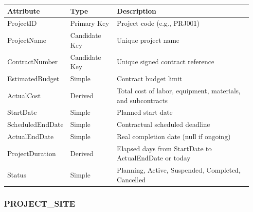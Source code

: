 \documentclass[a4paper,12pt]{report}
\newcounter{none} %
\begin{document}
{\def\LTcaptype{none} %
\begin{longtable}[]{@{}
  >{\raggedright\arraybackslash}p{}
  >{\raggedright\arraybackslash}p{}
  >{\raggedright\arraybackslash}p{}@{}}
\toprule\noalign{}
\begin{minipage}[b]{\linewidth}\raggedright
Attribute
\end{minipage} & \begin{minipage}[b]{\linewidth}\raggedright
Type
\end{minipage} & \begin{minipage}[b]{\linewidth}\raggedright
Description
\end{minipage} \\
\midrule\noalign{}
\endhead
\bottomrule\noalign{}
\endlastfoot
ProjectID & Primary Key & Project code (\allowbreak{}e.\allowbreak{}g., PRJ001) \\
ProjectName & Candidate Key & Unique project name \\
ContractNumber & Candidate Key & Unique signed contract reference \\
EstimatedBudget & Simple & Contract budget limit \\
ActualCost & Derived & Total cost of labor, equipment, materials, and subcontracts \\
StartDate & Simple & Planned start date \\
ScheduledEndDate & Simple & Contractual scheduled deadline \\
ActualEndDate & Simple & Real completion date (\allowbreak{}null if ongoing) \\
ProjectDuration & Derived & Elapsed days from StartDate to ActualEndDate or today \\
Status & Simple & Planning, Active, Suspended, Completed, Cancelled \\
\end{longtable}
}

\subsubsection{\texorpdfstring{PROJECT\texorpdfstring{\_\allowbreak{}}{_}SITE}{PROJECTSITE}}\label{project_site}
\end{document}
